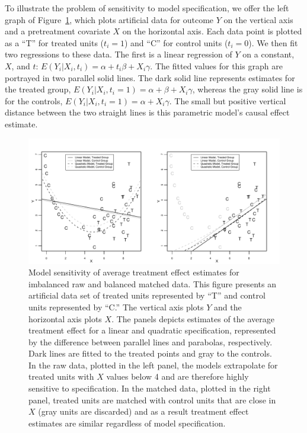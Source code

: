 \documentclass[11pt,titlepage]{article}
\begin{document}
To illustrate the problem of sensitivity to model specification, we
offer the left graph of Figure~\ref{fg:extrap}, which plots artificial
data for outcome $Y$ on the vertical axis and a pretreatment covariate
$X$ on the horizontal axis.  Each data point is plotted as a ``T'' for
treated units ($t_i=1$) and ``C'' for control units ($t_i=0$).  We
then fit two regressions to these data.  The first is a linear
regression of $Y$ on a constant, $X$, and $t$: $E(Y_i|X_i,t_i)=\alpha
+ t_i\beta + X_i\gamma$.  The fitted values for this graph are
portrayed in two parallel solid lines.  The dark solid line represents
estimates for the treated group,
$E(Y_i|X_i,t_i=1)=\alpha+\beta+X_i\gamma$, whereas the gray solid line
is for the controls, $E(Y_i|X_i,t_i=1)=\alpha+X_i\gamma$. The small
but positive vertical distance between the two straight lines is this
parametric model's causal effect estimate.
\begin{figure}[t] 
 \begin{center}
   \includegraphics[width=6in]{figs/olspanel.pdf}
  \end{center}
  \vspace{-0.275in}
  \caption{Model sensitivity of average treatment effect estimates for
    imbalanced raw and balanced matched data.  This figure presents an
    artificial data set of treated units represented by ``T'' and
    control units represented by ``C.'' The vertical axis plots $Y$
    and the horizontal axis plots $X$.  The panels depicts estimates
    of the average treatment effect for a linear and quadratic
    specification, represented by the difference between parallel
    lines and parabolas, respectively.  Dark lines are fitted to the
    treated points and gray to the controls.  In the raw data, plotted
    in the left panel, the models extrapolate for treated units with
    $X$ values below 4 and are therefore highly sensitive to
    specification.  In the matched data, plotted in the right panel,
    treated units are matched with control units that are close in $X$
    (gray units are discarded) and as a result treatment effect
    estimates are similar regardless of model specification.}
  \label{fg:extrap}
\end{figure}
\end{document}
